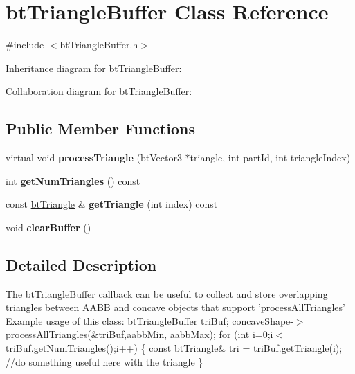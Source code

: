 \hypertarget{classbt_triangle_buffer}{\section{bt\+Triangle\+Buffer Class Reference}
\label{classbt_triangle_buffer}
}


{\ttfamily \#include $<$bt\+Triangle\+Buffer.\+h$>$}



Inheritance diagram for bt\+Triangle\+Buffer\+:


Collaboration diagram for bt\+Triangle\+Buffer\+:
\subsection*{Public Member Functions}
\begin{DoxyCompactItemize}
\item 
\hypertarget{classbt_triangle_buffer_a511eed7cab5be9dc886314611a2fda9d}{virtual void {\bfseries process\+Triangle} (bt\+Vector3 $\ast$triangle, int part\+Id, int triangle\+Index)}\label{classbt_triangle_buffer_a511eed7cab5be9dc886314611a2fda9d}

\item 
\hypertarget{classbt_triangle_buffer_ae637891f6c89a32d067a60b6da695c28}{int {\bfseries get\+Num\+Triangles} () const }\label{classbt_triangle_buffer_ae637891f6c89a32d067a60b6da695c28}

\item 
\hypertarget{classbt_triangle_buffer_a0f54b862fbf6a45b5699d329e51c73e3}{const \hyperlink{structbt_triangle}{bt\+Triangle} \& {\bfseries get\+Triangle} (int index) const }\label{classbt_triangle_buffer_a0f54b862fbf6a45b5699d329e51c73e3}

\item 
\hypertarget{classbt_triangle_buffer_a7fb6eab091904e3ebc4a206fee381a56}{void {\bfseries clear\+Buffer} ()}\label{classbt_triangle_buffer_a7fb6eab091904e3ebc4a206fee381a56}

\end{DoxyCompactItemize}


\subsection{Detailed Description}
The \hyperlink{classbt_triangle_buffer}{bt\+Triangle\+Buffer} callback can be useful to collect and store overlapping triangles between \hyperlink{class_a_a_b_b}{A\+A\+B\+B} and concave objects that support 'process\+All\+Triangles' Example usage of this class\+: \hyperlink{classbt_triangle_buffer}{bt\+Triangle\+Buffer} tri\+Buf; concave\+Shape-\/$>$process\+All\+Triangles(\&tri\+Buf,aabb\+Min, aabb\+Max); for (int i=0;i$<$tri\+Buf.\+get\+Num\+Triangles();i++) \{ const \hyperlink{structbt_triangle}{bt\+Triangle}\& tri = tri\+Buf.\+get\+Triangle(i); //do something useful here with the triangle \} 

